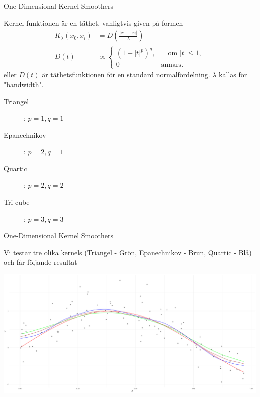 \documentclass[10pt,english]{beamer}
\begin{document}
\begin{frame}{One-Dimensional Kernel Smoothers}
    
    Kernel-funktionen är en täthet, vanligtvis given på formen
    \begin{align*}
        K_{\lambda} (x_0, x_i) &= D\left(\frac{|x_0 - x_i|}{\lambda}\right) \\
        D(t) &\propto \begin{cases}
            (1 - |t|^p)^q,& \quad \text{om } |t| \leq 1, \\
            0& \text{annars.}
        \end{cases}
    \end{align*}
    eller $D(t)$ är täthetsfunktionen för en standard normalfördelning. $\lambda$ kallas för "bandwidth".

    \begin{description}
        \item[Triangel] : $p = 1, q = 1$
        \item[Epanechnikov] : $p = 2, q = 1$
        \item[Quartic] : $p = 2, q = 2$ 
        \item[Tri-cube] : $p = 3, q = 3$  
    \end{description}
    

\end{frame}

\begin{frame}{One-Dimensional Kernel Smoothers}

    Vi testar tre olika kernels (Triangel - Grön, Epanechnikov - Brun, Quartic - Blå) och får följande resultat

    \includegraphics[width = \textwidth]{fig/kernel.png}
    
\end{frame}
\end{document}

